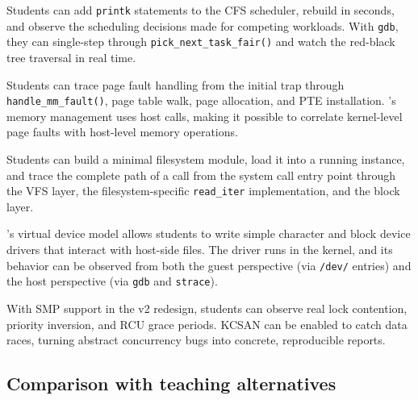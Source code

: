\begin{description}[style=nextline,leftmargin=2em]
  \item[Process scheduling.]
    Students can add \texttt{printk} statements to the CFS scheduler,
    rebuild in seconds, and observe the scheduling decisions made for
    competing workloads.  With \texttt{gdb}, they can single-step
    through \texttt{pick\_next\_task\_fair()} and watch the red-black
    tree traversal in real time.

  \item[Virtual memory.]
    Students can trace page fault handling from the initial trap through
    \texttt{handle\_mm\_fault()}, page table walk, page allocation, and
    PTE installation.  \UML{}'s memory management uses host 
    calls, making it possible to correlate kernel-level page faults with
    host-level memory operations.

  \item[Filesystem implementation.]
    Students can build a minimal filesystem module, load it into a
    running \UML{} instance, and trace the complete path of a
     call from the system call entry point through the
    VFS layer, the filesystem-specific \texttt{read\_iter} implementation,
    and the block layer.

  \item[Device drivers.]
    \UML{}'s virtual device model allows students to write simple
    character and block device drivers that interact with host-side
    files.  The driver runs in the \UML{} kernel, and its behavior
    can be observed from both the guest perspective (via
    \texttt{/dev/} entries) and the host perspective (via
    \texttt{gdb} and \texttt{strace}).

  \item[Concurrency and synchronization.]
    With SMP support in the v2 redesign, students can observe real
    lock contention, priority inversion, and RCU grace periods.  KCSAN
    can be enabled to catch data races, turning abstract concurrency
    bugs into concrete, reproducible reports.
\end{description}

\subsection{Comparison with teaching alternatives}

